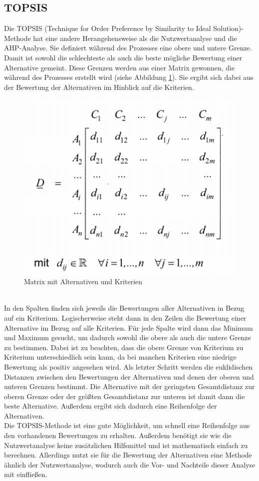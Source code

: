 \subsection{TOPSIS}
Die TOPSIS (Technique for Order Preference by Similarity to Ideal Solution)-Methode hat eine andere Herangehensweise als die Nutzwertanalyse und die AHP-Analyse. Sie definiert während des Prozesses eine obere und untere Grenze. Damit ist sowohl die schlechteste als auch die beste mögliche Bewertung einer Alternative gemeint. Diese Grenzen werden aus einer Matrix gewonnen, die während des Prozesses erstellt wird (siehe Abbildung \ref{img:topsis}). Sie ergibt sich dabei aus der Bewertung der Alternativen im Hinblick auf die Kriterien.
\begin{figure}[h!]
	\centering
	\includegraphics[scale = 0.7]{img/TOPSIS.png}
	\caption{Matrix mit Alternativen und Kriterien}
	\label{img:topsis}
\end{figure}\\
In den Spalten finden sich jeweils die Bewertungen aller Alternativen in Bezug auf ein Kriterium. Logischerweise steht dann in den Zeilen die Bewertung einer Alternative im Bezug auf alle Kriterien. Für jede Spalte wird dann das Minimum und Maximum gesucht, um dadurch sowohl die obere als auch die untere Grenze zu bestimmen. Dabei ist zu beachten, dass die obere Grenze von Kriterium zu Kriterium unterschiedlich sein kann, da bei manchen Kriterien eine niedrige Bewertung als positiv angesehen wird. Als letzter Schritt werden die euklidischen Distanzen zwischen den Bewertungen der Alternativen und denen der oberen und unteren Grenzen bestimmt. Die Alternative mit der geringsten Gesamtdistanz zur oberen Grenze oder der größten Gesamtdistanz zur unteren ist damit dann die beste Alternative. Außerdem ergibt sich dadurch eine Reihenfolge der Alternativen.\\
Die TOPSIS-Methode ist eine gute Möglichkeit, um schnell eine Reihenfolge aus den vorhandenen Bewertungen zu erhalten. Außerdem benötigt sie wie die Nutzwertanalyse keine zusätzlichen Hilfsmittel und ist mathematisch einfach zu berechnen. Allerdings nutzt sie für die Bewertung der Alternativen eine Methode ähnlich der Nutzwertanalyse, wodurch auch die Vor- und Nachteile dieser Analyse mit einfließen.
